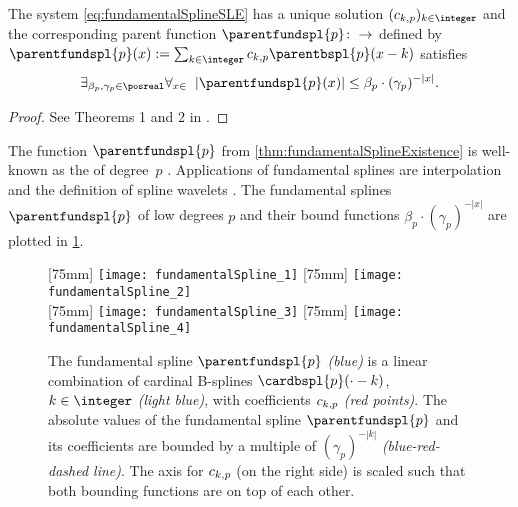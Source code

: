 \begin{theorem}
  \label{thm:fundamentalSplineExistence}
  The system \eqref{eq:fundamentalSplineSLE} has a unique solution
  $(\fundsplcoeff{k}{p})_{k \in \integer}$ and the corresponding parent function
  $\parentfundspl{p}\colon \real \to \real$ defined by
  $\parentfundspl{p}(x) :=
  \sum_{k \in \integer} \fundsplcoeff{k}{p} \parentbspl{p}(x - k)$
  satisfies
  \begin{equation}
    \exfalarge{\beta_p, \gamma_p \in \posreal}{x \in \real}{
      |\parentfundspl{p}(x)|
      \le \beta_p \cdot (\gamma_p)^{-|x|}.
    }
  \end{equation}
\end{theorem}

\begin{proof}
  See Theorems 1 and 2 in \cite{Schoenberg72Cardinal}.
\end{proof}

The function $\parentfundspl{p}$ from \cref{thm:fundamentalSplineExistence}
is well-known as the  of degree~$p$
.
Applications of fundamental splines are interpolation and
the definition of spline wavelets \cite{Chui92Introduction}.
The fundamental splines $\parentfundspl{p}$ of low degrees $p$ and
their bound functions $\beta_p \cdot (\gamma_p)^{-|x|}$
are plotted in \cref{fig:fundamentalSpline}.

\begin{figure}
  [75mm]{%
    \texttt{[image: fundamentalSpline\_1]}%
  }%
  \hfill%
  [75mm]{%
    \texttt{[image: fundamentalSpline\_2]}%
  }\\[4mm]%
  [75mm]{%
    \texttt{[image: fundamentalSpline\_3]}%
  }%
  \hfill%
  [75mm]{%
    \texttt{[image: fundamentalSpline\_4]}%
  }%
  \caption[%
    Fundamental splines and their B-spline coefficients%
  ]{%
    The fundamental spline $\parentfundspl{p}$ \emph{\textcolor{C0}{(blue)}}
    is a linear combination of cardinal B-splines $\cardbspl{p}({\cdot} - k)$,
    $k \in \integer$ \emph{\textcolor{lightC0}{(light blue)}},
    with coefficients $\fundsplcoeff{k}{p}$ \emph{\textcolor{C1}{(red points)}}.
    The absolute values of the fundamental spline $\parentfundspl{p}$ and
    its coefficients are bounded by a multiple of $(\gamma_p)^{-|k|}$
    \emph{(\textcolor{C0}{blue}-\textcolor{C1}{red}-dashed line)}.
    The axis for $\fundsplcoeff{k}{p}$ (on the right side) is scaled such that
    both bounding functions are on top of each other.%
  }%
  \label{fig:fundamentalSpline}%
\end{figure}

